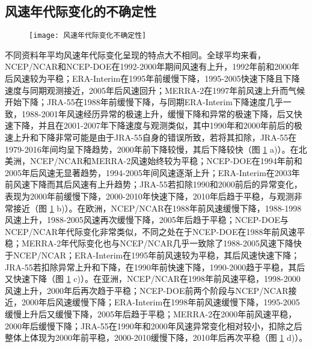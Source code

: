 \subsection{风速年代际变化的不确定性}

\begin{figure}[!b]
    \centering
    \texttt{[image: 风速年代际变化不确定性]}
    \label{fig:uncertaintywinddecadalchange}
\end{figure}

不同资料年平均风速年代际变化呈现的特点大不相同。全球平均来看，NCEP/NCAR和NCEP-DOE在1992-2000年期间风速有上升，1992年前和2000年后风速较为平稳；ERA-Interim在1995年前缓慢下降，1995-2005快速下降且下降速度与同期观测接近，2005年后风速回升；MERRA-2在1997年前风速上升而气候开始下降；JRA-55在1988年前缓慢下降，与同期ERA-Interim下降速度几乎一致，1988-2001年风速经历异常的极速上升，缓慢下降和异常的极速下降，后又快速下降，并且在2001-2007年下降速度与观测类似，其中1990年和2000年前后的极速上升和下降非常可能是由于JRA-55自身的错误所致，若将其扣除，JRA-55在1979-2016年间均呈下降趋势，2000年前下降较慢，其后下降较快（图 \ref{fig:uncertaintywinddecadalchange} a)）。在北美洲，NCEP/NCAR和MERRA-2风速始终较为平稳；NCEP-DOE在1994年前和2005年后风速无显著趋势，1994-2005年间风速逐渐上升；ERA-Interim在2003年前风速下降而其后风速有上升趋势；JRA-55若扣除1990和2000前后的异常变化，表现为2000年前缓慢下降，2000-2010年快速下降，2010年后趋于平稳，与观测非常接近（图 \ref{fig:uncertaintywinddecadalchange} b)）。在欧洲，NCEP/NCAR在1988年前风速缓慢下降，1988-1998风速上升，1988-2005风速再次缓慢下降，2005年后趋于平稳；NCEP-DOE与NCEP/NCAR年代际变化非常类似，不同之处在于NCEP-DOE在1988年前风速平稳；MERRA-2年代际变化也与NCEP/NCAR几乎一致除了1988-2005风速下降快于NCEP/NCAR；ERA-Interim在1995年前风速较为平稳，其后风速快速下降；JRA-55若扣除异常上升和下降，在1990年前快速下降，1990-2000趋于平稳，其后又快速下降（图 \ref{fig:uncertaintywinddecadalchange} c)）。在亚洲，NCEP/NCAR在1998年前风速平稳，1998-2000风速上升，2000年后再次趋于平稳；NCEP-DOE前两个阶段与NCEP/NCAR接近，2000年后风速缓慢下降；ERA-Interim在1998年前风速缓慢下降，1995-2005缓慢上升后又缓慢下降，2005年后趋于平稳；MERRA-2在2000年前风速平稳，2000年后缓慢下降；JRA-55在1990年和2000年风速异常变化相对较小，扣除之后整体上体现为2000年前平稳，2000-2010缓慢下降，2010年后再次平稳（图 \ref{fig:uncertaintywinddecadalchange} d)）。


